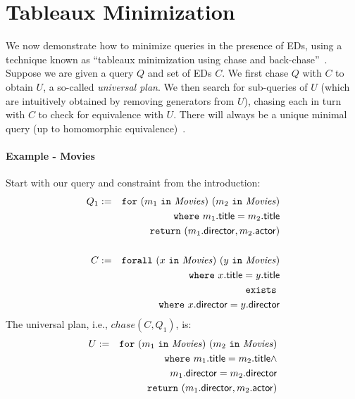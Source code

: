\documentclass{sigplanconf}
\newcommand{\FOR}{{\tt for}\relax\ifmmode\ \else\xspace\fi}
\newcommand{\FORALL}{{\tt forall}\relax\ifmmode\ \else\xspace\fi}
\newcommand{\EXISTS}{{\tt exists}\relax\ifmmode\ \else\xspace\fi}
\newcommand{\WHERE}{{\tt where}\relax\ifmmode\ \else\xspace\fi}
\newcommand{\IN}{ \ {\tt in} \ }
\newcommand{\RETURN}{{\tt return}\relax\ifmmode\ \else\xspace\fi}
\newcommand{\relation}[1]{\ensuremath{\mathit{#1}}\xspace}
\begin{document}
\section{Tableaux Minimization}
\label{sec:minimize}

We now demonstrate how to minimize queries in the presence of EDs, using a technique known as ``tableaux minimization using chase and back-chase''~\cite{Deutsch:2006:QRC:1121995.1122010}.
Suppose we are given a query $Q$ and set of EDs $C$.
We first chase $Q$ with $C$ to obtain $U$, a so-called {\it universal plan}.
We then search for sub-queries of $U$ (which are intuitively obtained by removing generators from $U$), chasing each in turn with $C$ to check for equivalence with $U$.
There will always be a unique minimal query (up to homomorphic equivalence)~\cite{Deutsch:2006:QRC:1121995.1122010}.

\paragraph{Example - Movies}
Start with our query and constraint from the introduction:
\begin{eqnarray*}
Q_1 & := & \FOR (m_1 \IN \relation{Movies}) \ (m_2 \IN \relation{Movies}) \\
 & & \WHERE m_1.{\sf title} = m_2.{\sf title} \\
 & & \RETURN (m_1.{\sf director}, m_2.{\sf actor}) \\
 & & \\
C & := & \FORALL (x \IN \relation{Movies}) \ (y \IN \relation{Movies}) \\
& & \WHERE x.{\sf title} = y.{\sf title} \\
& & \EXISTS \\
& & \WHERE x.{\sf director} = y.{\sf director}
\end{eqnarray*}
The universal plan, i.e., $chase(C,Q_1)$, is:
\begin{eqnarray*}
U & := & \FOR (m_1 \IN \relation{Movies}) \ (m_2 \IN \relation{Movies}) \\
 & & \WHERE m_1.{\sf title} = m_2.{\sf title} \wedge \\
 & & \qquad\quad m_1.{\sf director} = m_2.{\sf 
director} \\
 & & \RETURN (m_1.{\sf director}, m_2.{\sf actor})
\end{eqnarray*}
\end{document}

